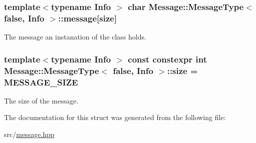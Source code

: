 \subsubsection[{\texorpdfstring{message}{message}}]{\setlength{\rightskip}{0pt plus 5cm}template$<$typename Info $>$ char {\bf Message\+::\+Message\+Type}$<$ false, Info $>$\+::message\mbox{[}{\bf size}\mbox{]}}\hypertarget{struct_message_1_1_message_type_3_01false_00_01_info_01_4_af9557cb65a7883b01c7cbe30e6211f98}{}\label{struct_message_1_1_message_type_3_01false_00_01_info_01_4_af9557cb65a7883b01c7cbe30e6211f98}


The message an instanation of the class holds. 

\subsubsection[{\texorpdfstring{size}{size}}]{\setlength{\rightskip}{0pt plus 5cm}template$<$typename Info $>$ const constexpr int {\bf Message\+::\+Message\+Type}$<$ false, Info $>$\+::size = {\bf M\+E\+S\+S\+A\+G\+E\+\_\+\+S\+I\+ZE}\hspace{0.3cm}{\ttfamily [static]}}\hypertarget{struct_message_1_1_message_type_3_01false_00_01_info_01_4_ab1478611666e0b38703dbb0512262d32}{}\label{struct_message_1_1_message_type_3_01false_00_01_info_01_4_ab1478611666e0b38703dbb0512262d32}


The size of the message. 



The documentation for this struct was generated from the following file\+:\begin{DoxyCompactItemize}
\item 
src/\hyperlink{message_8hpp}{message.\+hpp}\end{DoxyCompactItemize}
